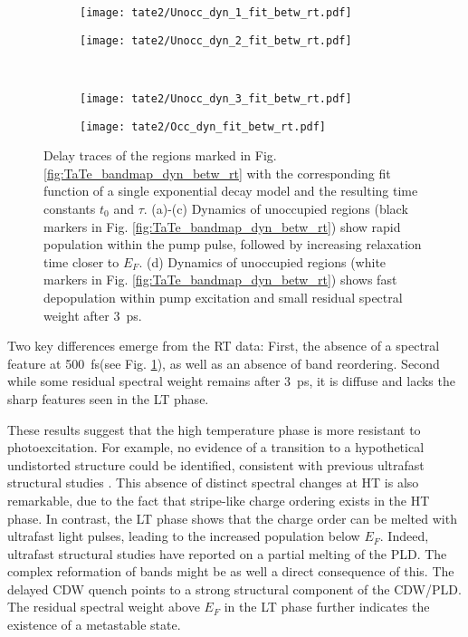 \begin{figure}[b!]
	\centering
	\begin{subfigure}[b]{0.33\textwidth}
		\texttt{[image: tate2/Unocc\_dyn\_1\_fit\_betw\_rt.pdf]}
		\caption{}
	\end{subfigure}
	\begin{subfigure}[b]{0.33\textwidth}
		\texttt{[image: tate2/Unocc\_dyn\_2\_fit\_betw\_rt.pdf]}
		\caption{}
	\end{subfigure}
	\\
	\begin{subfigure}[b]{0.33\textwidth}
		\texttt{[image: tate2/Unocc\_dyn\_3\_fit\_betw\_rt.pdf]}
		\caption{}
	\end{subfigure}
	\begin{subfigure}[b]{0.33\textwidth}
		\texttt{[image: tate2/Occ\_dyn\_fit\_betw\_rt.pdf]}
		\caption{}
	\end{subfigure}
	\caption{Delay traces of the regions marked in Fig. \ref{fig:TaTe_bandmap_dyn_betw_rt} with the corresponding fit function of a single exponential decay model and the resulting time constants $t_0$ and $\tau$. (a)-(c) Dynamics of unoccupied regions (black markers in Fig. \ref{fig:TaTe_bandmap_dyn_betw_rt}) show rapid population within the pump pulse, followed by increasing relaxation time closer to $E_F$. (d) Dynamics of unoccupied regions (white markers in Fig. \ref{fig:TaTe_bandmap_dyn_betw_rt}) shows fast depopulation within pump excitation and small residual spectral weight after \qty{3}{\pico\second}.}
	\label{fig:TaTe_dyn_betw_rt}
\end{figure}

Two key differences emerge from the RT data:
First, the absence of a spectral feature at \qty{500}{\femto\second}(see Fig. \ref{fig:TaTe_dyn_betw_rt}), as well as an absence of band reordering.
Second while some residual spectral weight remains after \qty{3}{\pico\second}, it is diffuse and lacks the sharp features seen in the LT phase.

These results suggest that the high temperature phase is more resistant to photoexcitation.
For example, no evidence of a transition to a hypothetical undistorted structure could be identified, consistent with previous ultrafast structural studies \cite{domrose_femtosecond_2024}.
This absence of distinct spectral changes at HT is also remarkable, due to the fact that stripe-like charge ordering exists in the HT phase.
In contrast, the LT phase shows that the charge order can be melted with ultrafast light pulses, leading to the increased population below $E_F$.
Indeed, ultrafast structural studies \cite{domrose_femtosecond_2024, siddiqui_ultrafast_2021} have reported on a partial melting of the PLD.
The complex reformation of bands might be as well a direct consequence of this.
The delayed CDW quench points to a strong structural component of the CDW/PLD.
The residual spectral weight above $E_F$ in the LT phase further indicates the existence of a metastable state.

